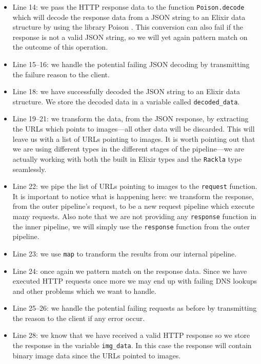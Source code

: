 \documentclass{cslthse-msc}
\begin{document}
\begin{itemize}
\item Line 14: we pass the HTTP response data to the function \lstinline{Poison.decode} which will decode the response data from a JSON string to an Elixir data structure by using the library Poison \cite{poison}. This conversion can also fail if the response is not a valid JSON string, so we will yet again pattern match on the outcome of this operation.

\item Line 15--16: we handle the potential failing JSON decoding by transmitting the failure reason to the client.

\item Line 18: we have successfully decoded the JSON string to an Elixir data structure. We store the decoded data in a variable called \lstinline{decoded_data}.

\item Line 19--21: we transform the data, from the JSON response, by extracting the URLs which points to images---all other data will be discarded. This will leave us with a list of URLs pointing to images. It is worth pointing out that we are using different types in the different stages of the pipeline---we are actually working with both the built in Elixir types and the \lstinline{Rackla} type seamlessly.

\item Line 22: we pipe the list of URLs pointing to images to the \lstinline{request} function. It is important to notice what is happening here: we transform the response, from the outer pipeline's request, to be a new request pipeline which execute many requests. Also note that we are not providing any \lstinline{response} function in the inner pipeline, we will simply use the \lstinline{response} function from the outer pipeline.

\item Line 23: we use \lstinline{map} to transform the results from our internal pipeline.

\item Line 24: once again we pattern match on the response data. Since we have executed HTTP requests once more we may end up with failing DNS lookups and other problems which we want to handle.

\item Line 25--26: we handle the potential failing requests as before by transmitting the reason to the client if any error occur.

\item Line 28: we know that we have received a valid HTTP response so we store the response in the variable \lstinline{img_data}. In this case the response will contain binary image data since the URLs pointed to images.


\end{itemize}
\end{document}
